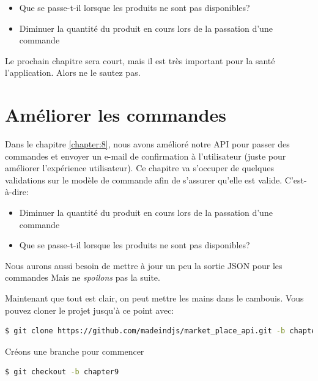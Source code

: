 \documentclass[]{report}
\begin{document}
   \begin{itemize}
     \item Que se passe-t-il lorsque les produits ne sont pas disponibles?
     \item Diminuer la quantité du produit en cours lors de la passation d'une commande
   \end{itemize}

   Le prochain chapitre sera court, mais il est très important pour la santé l'application. Alors ne le sautez pas.

\chapter{Améliorer les commandes}\label{chapter:9}

  Dans le chapitre \ref{chapter:8}, nous avons amélioré notre API pour passer des commandes et envoyer un e-mail de confirmation à l'utilisateur (juste pour améliorer l'expérience utilisateur). Ce chapitre va s'occuper de quelques validations sur le modèle de commande afin de s'assurer qu'elle est valide. C'est-à-dire:

  \begin{itemize}
    \item Diminuer la quantité du produit en cours lors de la passation d'une commande
    \item Que se passe-t-il lorsque les produits ne sont pas disponibles?
  \end{itemize}

  Nous aurons aussi besoin de mettre à jour un peu la sortie JSON pour les commandes Mais ne \textit{spoilons} pas la suite.

  Maintenant que tout est clair, on peut mettre les mains dans le cambouis. Vous pouvez cloner le projet jusqu'à ce point avec:

  \begin{scriptsize}
    \begin{lstlisting}[language=bash]
    $ git clone https://github.com/madeindjs/market_place_api.git -b chapter8
    \end{lstlisting}
  \end{scriptsize}

  Créons une branche pour commencer

  \begin{scriptsize}
    \begin{lstlisting}[language=bash]
    $ git checkout -b chapter9
    \end{lstlisting}
  \end{scriptsize}
\end{document}
